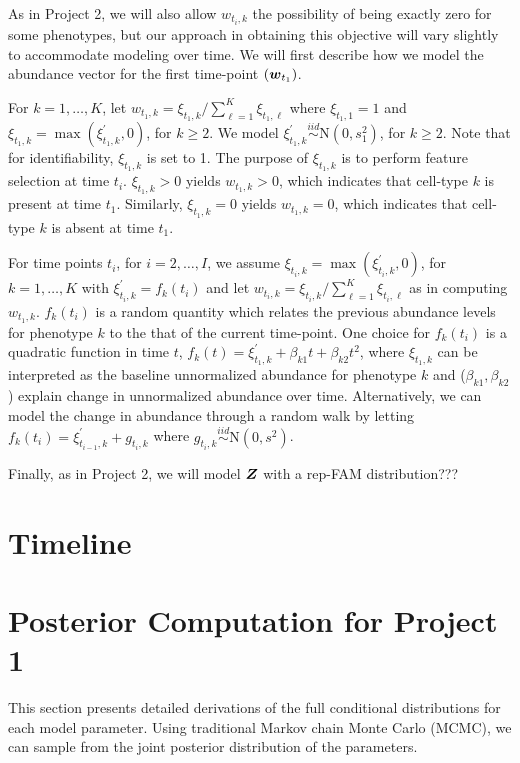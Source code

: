 \documentclass[12pt,]{article}
\newcommand{\N}{ \mathcal{N} }
\newcommand{\iid}{\overset{iid}{\sim}}
\def\N{\text{N}}
\newcommand{\bZ}{\mbox{\boldmath $Z$}}
\newcommand{\bw}{\mbox{\boldmath $w$}}
\begin{document}
As in Project 2, we will also allow $w_{t_i,k}$ the possibility of being
exactly zero for some phenotypes, but our approach in obtaining this objective
will vary slightly to accommodate modeling over time. We will first describe
how we model the abundance vector for the first time-point $(\bw_{t_1})$.

For $k=1,\ldots,K$, let $w_{t_1,k} = \xi_{t_1,k}/\sum_{\ell=1}^K
\xi_{t_1, \ell}$ where $\xi_{t_1,1}=1$ and $\xi_{t_1,k} =
\max(\xi^\prime_{t_1,k}, 0)$, for $k\ge 2$. We model $\xi^\prime_{t_1,k} \iid
\N(0, s^2_1)$, for $k\ge 2$.  Note that for identifiability, $\xi_{t_1,k}$ is
set to 1. The purpose of $\xi_{t_1,k}$ is to perform feature selection at time
$t_i$. $\xi_{t_1,k} > 0$ yields $w_{t_1,k} >0$, which indicates that cell-type
$k$ is present at time $t_1$. Similarly, $\xi_{t_1,k} = 0$ yields $w_{t_1,k}
=0$, which indicates that cell-type $k$ is absent at time $t_1$. 

For time points $t_i$, for $i=2, \ldots, I$, we assume $\xi_{t_i,k} =
\max(\xi^\prime_{t_i,k}, 0)$, for $k=1, \ldots, K$ with $\xi^\prime_{t_i,k} =
f_k(t_i)$ and let $w_{t_i,k} = \xi_{t_i,k}/\sum_{\ell=1}^K \xi_{t_i,\ell}$ as
in computing $w_{t_1,k}$. $f_k(t_i)$ is a random quantity which relates the
previous abundance levels for phenotype $k$ to the that of the current
time-point. One choice for $f_k(t_i)$ is a quadratic function in time $t$,
$f_k(t) = \xi^\prime_{t_1,k} + \beta_{k1}t + \beta_{k2}t^2$, where
$\xi_{t_1,k}$ can be interpreted as the baseline unnormalized abundance for
phenotype $k$ and ($\beta_{k1}, \beta_{k2}$) explain change in unnormalized
abundance over time. Alternatively, we can model the change in abundance
through a random walk by letting $f_k(t_i) = \xi^\prime_{t_{i-1},k} +
g_{t_i,k}$ where $g_{t_i, k} \iid \N(0, s^2)$.

Finally, as in Project 2, we will model $\bZ$ with a rep-FAM distribution???


\section{Timeline}\label{sec:time}





\appendix
\section{Posterior Computation for Project 1}
This section presents detailed derivations of the full conditional
distributions for each model parameter. Using traditional Markov
chain Monte Carlo (MCMC), we can sample from the joint posterior 
distribution of the parameters.
\end{document}
